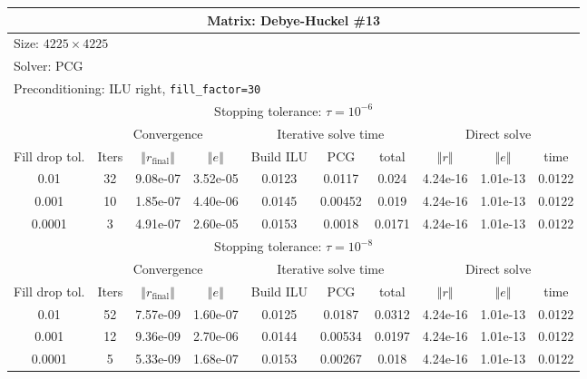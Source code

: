\documentclass[oneside,final]{amsart}  %
\begin{document}
\begin{tabular}{|c|c|c|c|c|c|c|c|c|c|}
\hline
\multicolumn{10}{|c|}{Matrix: Debye-Huckel \#13}\tabularnewline
\hline
  \multicolumn{10}{|l|}{Size: $4225\times4225$}\tabularnewline
\hline
\multicolumn{10}{|l|}{Solver: PCG}\tabularnewline
\hline
\multicolumn{10}{|l|}{Preconditioning: ILU right, \texttt{fill\_factor=30}}\tabularnewline
\hline
\hline
\multicolumn{10}{|c|}{Stopping tolerance: $\tau=10^{-6}$}\tabularnewline
\hline
\hline
 & \multicolumn{3}{c|}{Convergence} & \multicolumn{3}{c|}{Iterative solve time} & \multicolumn{3}{c|}{Direct solve}\tabularnewline
\hline
Fill drop tol.  & Iters & $\left\Vert r_{\text{final}}\right\Vert $  & $\left\Vert e\right\Vert $  & Build ILU  & PCG  & total  & $\left\Vert r\right\Vert $ & $\left\Vert e\right\Vert $  & time\tabularnewline
\hline
  0.01 & 32 & 9.08e-07 & 3.52e-05 &     0.0123 &     0.0117 &      0.024 & 4.24e-16 & 1.01e-13 &     0.0122\\
  \hline
  0.001 & 10 & 1.85e-07 & 4.40e-06 &     0.0145 &    0.00452 &      0.019 & 4.24e-16 & 1.01e-13 &     0.0122\\
  \hline
  0.0001 & 3 & 4.91e-07 & 2.60e-05 &     0.0153 &     0.0018 &     0.0171 & 4.24e-16 & 1.01e-13 &     0.0122\\
  \hline
\hline
\multicolumn{10}{|c|}{Stopping tolerance: $\tau=10^{-8}$}\tabularnewline
\hline
\hline
 & \multicolumn{3}{c|}{Convergence} & \multicolumn{3}{c|}{Iterative solve time} & \multicolumn{3}{c|}{Direct solve }\tabularnewline
\hline
Fill drop tol.  & Iters  & $\left\Vert r_{\text{final}}\right\Vert $  & $\left\Vert e\right\Vert $ & Build ILU  & PCG  & total  & $\left\Vert r\right\Vert $  & $\left\Vert e\right\Vert $  & time\tabularnewline
\hline
  0.01 & 52 & 7.57e-09 & 1.60e-07 &     0.0125 &     0.0187 &     0.0312 & 4.24e-16 & 1.01e-13 &     0.0122\\
  \hline
  0.001 & 12 & 9.36e-09 & 2.70e-06 &     0.0144 &    0.00534 &     0.0197 & 4.24e-16 & 1.01e-13 &     0.0122\\
  \hline
  0.0001 & 5 & 5.33e-09 & 1.68e-07 &     0.0153 &    0.00267 &      0.018 & 4.24e-16 & 1.01e-13 &     0.0122\\
  \hline
\end{tabular}
\end{document}

